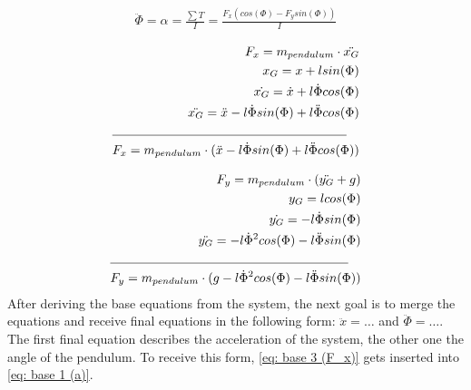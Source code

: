     \begin{align}    \label{eq: base 2 (alpha)}
            \ddot{\Phi} = \alpha = \frac{\sum T}{I} = \frac{F_x(cos(\Phi)-F_y sin(\Phi))}{I}
    \end{align}

    \begin{align}   \label{eq: base 3 (F_x)}
        F_x = m_{pendulum} \cdot \ddot{x_G} \notag\\
        x_G = x + l sin(\Phi)\notag \\
        \dot{x_G} = \dot{x} + l \dot{\Phi} cos(\Phi)\notag \\
        \ddot{x_G} = \ddot{x} - l \dot{\Phi} sin(\Phi) + l \ddot{\Phi} cos(\Phi)\notag \\ \cline{1-2}
        F_x = m_{pendulum}\cdot(\ddot{x} - l \dot{\Phi} sin(\Phi) + l \ddot{\Phi} cos(\Phi))
    \end{align}
 
    \begin{align}   \label{eq: base 4 (F_y)}
        F_y = m_{pendulum} \cdot (\ddot{y_G} + g)\notag \\
        y_G = l  cos(\Phi)\notag \\
        \dot{y_G} = -l  \dot{\Phi}  sin(\Phi)\notag \\
        \ddot{y_G} = -l \dot{\Phi}^2  cos(\Phi) - l \ddot{\Phi} sin(\Phi)\notag \\\cline{1-2}
        F_y = m_{pendulum} \cdot (g - l \dot{\Phi}^2  cos(\Phi) - l \ddot{\Phi} sin(\Phi))
    \end{align}
    After deriving the base equations from the system, the next goal is to merge the equations and receive final equations in the following form: $\ddot{x} = \dots$ and $\ddot{\Phi} = \dots$. The first final equation describes the acceleration of the system, the other one the angle of the pendulum. To receive this form, \autoref{eq: base 3 (F_x)} gets inserted into \autoref{eq: base 1 (a)}.
    
